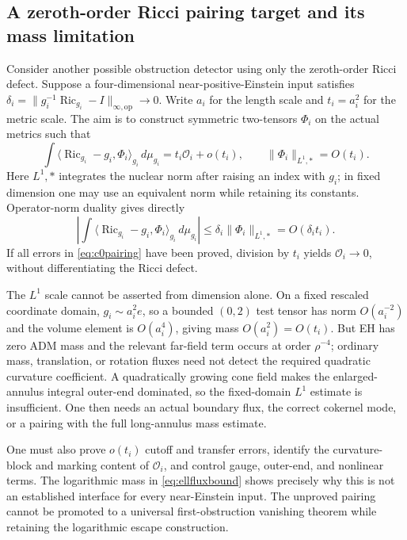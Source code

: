 \documentclass[a4paper,11pt]{article}
\numberwithin{equation}{section}
\theoremstyle{definition}
\newcommand{\Ric}{\operatorname{Ric}}
\newcommand{\op}{\mathrm{op}}
\begin{document}
\subsection{A zeroth-order Ricci pairing target and its mass limitation}\label{sec:c0pairing}
Consider another possible obstruction detector using only the zeroth-order Ricci defect. Suppose a four-dimensional near-positive-Einstein input satisfies $\delta_i=\|g_i^{-1}\Ric_{g_i}-I\|_{\infty,\op}\to0$. Write $a_i$ for the length scale and $t_i=a_i^2$ for the metric scale. The aim is to construct symmetric two-tensors $\Phi_i$ on the actual metrics such that
\begin{equation}\label{eq:c0pairing}
\int\langle\Ric_{g_i}-g_i,\Phi_i\rangle_{g_i}\,d\mu_{g_i}
=t_i\mathcal O_i+o(t_i),\qquad
\|\Phi_i\|_{L^1,*}=O(t_i).
\end{equation}
Here $L^1,*$ integrates the nuclear norm after raising an index with $g_i$; in fixed dimension one may use an equivalent norm while retaining its constants. Operator-norm duality gives directly
\[
\left|\int\langle\Ric_{g_i}-g_i,\Phi_i\rangle_{g_i}\,d\mu_{g_i}\right|
\le\delta_i\|\Phi_i\|_{L^1,*}=O(\delta_it_i).
\]
If all errors in \eqref{eq:c0pairing} have been proved, division by $t_i$ yields $\mathcal O_i\to0$, without differentiating the Ricci defect.

The $L^1$ scale cannot be asserted from dimension alone. On a fixed rescaled coordinate domain, $g_i\sim a_i^2e$, so a bounded $(0,2)$ test tensor has norm $O(a_i^{-2})$ and the volume element is $O(a_i^4)$, giving mass $O(a_i^2)=O(t_i)$. But EH has zero ADM mass and the relevant far-field term occurs at order $\rho^{-4}$; ordinary mass, translation, or rotation fluxes need not detect the required quadratic curvature coefficient. A quadratically growing cone field makes the enlarged-annulus integral outer-end dominated, so the fixed-domain $L^1$ estimate is insufficient. One then needs an actual boundary flux, the correct cokernel mode, or a pairing with the full long-annulus mass estimate.

One must also prove $o(t_i)$ cutoff and transfer errors, identify the curvature-block and marking content of $\mathcal O_i$, and control gauge, outer-end, and nonlinear terms. The logarithmic mass in \eqref{eq:ellfluxbound} shows precisely why this is not an established interface for every near-Einstein input. The unproved pairing cannot be promoted to a universal first-obstruction vanishing theorem while retaining the logarithmic escape construction.
\end{document}
